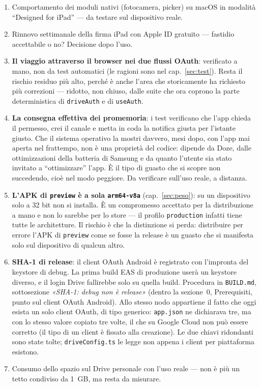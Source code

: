 \documentclass[11pt,a4paper]{report}
\begin{document}
\begin{enumerate}[nosep]
  \item Comportamento dei moduli nativi (fotocamera, picker) su macOS in
        modalit\`a ``Designed for iPad'' — da testare sul dispositivo reale.
  \item Rinnovo settimanale della firma iPad con Apple ID gratuito —
        fastidio accettabile o no? Decisione dopo l'uso.
  \item \textbf{Il viaggio attraverso il browser nei due flussi OAuth}:
        verificato a mano, non da test automatici (le ragioni sono nel
        cap.~\ref{sec:test}). Resta il rischio residuo pi\`u alto, perch\'e
        \`e anche l'area che storicamente ha richiesto pi\`u correzioni ---
        ridotto, non chiuso, dalle suite che ora coprono la parte
        deterministica di \texttt{driveAuth} e di \texttt{useAuth}.
  \item \textbf{La consegna effettiva dei promemoria}: i test verificano che
        l'app chieda il permesso, crei il canale e metta in coda la notifica
        giusta per l'istante giusto. Che il sistema operativo la mostri
        davvero, mesi dopo, con l'app mai aperta nel frattempo, non \`e una
        propriet\`a del codice: dipende da Doze, dalle ottimizzazioni della
        batteria di Samsung e da quanto l'utente sia stato invitato a
        ``ottimizzare'' l'app. \`E il tipo di guasto che si scopre non
        succedendo, cio\`e nel modo peggiore. Da verificare sull'uso reale, a
        distanza.
  \item \textbf{L'APK di \texttt{preview} \`e a sola \texttt{arm64-v8a}}
        (cap.~\ref{sec:peso}): su un dispositivo solo a 32 bit non si installa.
        \`E un compromesso accettato per la distribuzione a mano e non lo
        sarebbe per lo store --- il profilo \texttt{production} infatti tiene
        tutte le architetture. Il rischio \`e che la distinzione si perda:
        distribuire per errore l'APK di \texttt{preview} come se fosse la
        release \`e un guasto che si manifesta solo sul dispositivo di
        qualcun altro.
  \item \textbf{SHA-1 di release}: il client OAuth Android \`e registrato con
        l'impronta del keystore di debug. La prima build EAS di produzione
        user\`a un keystore diverso, e il login Drive fallirebbe solo su quella
        build. Procedura in \texttt{BUILD.md}, sottosezione
        \emph{«SHA-1: debug non \`e release»} (dentro la sezione~0,
        Prerequisiti, punto sul client OAuth Android). Allo stesso nodo
        appartiene il fatto che oggi esista un solo client OAuth, di tipo
        generico: \texttt{app.json} ne dichiarava tre, ma con lo stesso valore
        copiato tre volte, il che su Google Cloud non pu\`o essere corretto
        (il tipo di un client \`e fissato alla creazione). Le due chiavi
        ridondanti sono state tolte; \texttt{driveConfig.ts} le legge non
        appena i client per piattaforma esistono.
  \item Consumo dello spazio sul Drive personale con l'uso reale — non \`e
        pi\`u un tetto condiviso da 1~GB, ma resta da misurare.
\end{enumerate}
\end{document}
